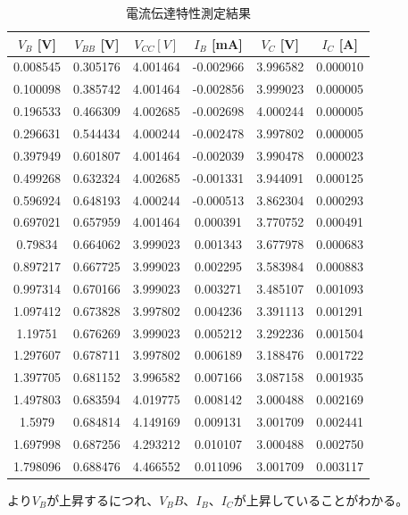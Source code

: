 \documentclass[11pt,dvipdfmx]{jarticle}
\begin{document}
		\begin{table}[H]
			\centering
			\caption{電流伝達特性測定結果}
			\begin{tabular}{cccccc}
			\hline
			$V_B$ [V] & $V_{BB}$ [V]& $V_{CC} [V]$ & $I_B$ [mA]& $V_C$ [V]& $I_C$ [A]\\ \hline\hline
			0.008545 & 0.305176 & 4.001464 & -0.002966 & 3.996582 & 0.000010 \\
			0.100098 & 0.385742 & 4.001464 & -0.002856 & 3.999023 & 0.000005 \\
			0.196533 & 0.466309 & 4.002685 & -0.002698 & 4.000244 & 0.000005 \\
			0.296631 & 0.544434 & 4.000244 & -0.002478 & 3.997802 & 0.000005 \\
			0.397949 & 0.601807 & 4.001464 & -0.002039 & 3.990478 & 0.000023 \\
			0.499268 & 0.632324 & 4.002685 & -0.001331 & 3.944091 & 0.000125 \\
			0.596924 & 0.648193 & 4.000244 & -0.000513 & 3.862304 & 0.000293 \\
			0.697021 & 0.657959 & 4.001464 & 0.000391 & 3.770752 & 0.000491 \\
			0.79834 & 0.664062 & 3.999023 & 0.001343 & 3.677978 & 0.000683 \\
			0.897217 & 0.667725 & 3.999023 & 0.002295 & 3.583984 & 0.000883 \\
			0.997314 & 0.670166 & 3.999023 & 0.003271 & 3.485107 & 0.001093 \\
			1.097412 & 0.673828 & 3.997802 & 0.004236 & 3.391113 & 0.001291 \\
			1.19751 & 0.676269 & 3.999023 & 0.005212 & 3.292236 & 0.001504 \\
			1.297607 & 0.678711 & 3.997802 & 0.006189 & 3.188476 & 0.001722 \\
			1.397705 & 0.681152 & 3.996582 & 0.007166 & 3.087158 & 0.001935 \\
			1.497803 & 0.683594 & 4.019775 & 0.008142 & 3.000488 & 0.002169 \\
			1.5979 & 0.684814 & 4.149169 & 0.009131 & 3.001709 & 0.002441 \\
			1.697998 & 0.687256 & 4.293212 & 0.010107 & 3.000488 & 0.002750 \\
			1.798096 & 0.688476 & 4.466552 & 0.011096 & 3.001709 & 0.003117 \\
			\hline
			\end{tabular}
			\label{tab:電流伝達特性測定結果}
		\end{table}
		より$V_B$が上昇するにつれ、$V_BB$、$I_B$、$I_C$が上昇していることがわかる。
\end{document}
